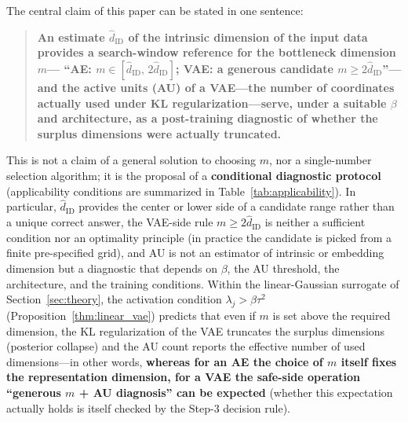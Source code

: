 \documentclass[make,article,submit,pdftex,moreauthors]{Definitions/mdpi}
\newcommand{\hatdID}{\hat{d}_{\mathrm{ID}}}
\begin{document}
The central claim of this paper can be stated in one sentence:
\begin{quote}
\textbf{An estimate $\hatdID$ of the intrinsic dimension of the input data
provides a search-window reference for the bottleneck dimension $m$---%
``AE: $m \in [\hatdID,\, 2\hatdID]$; VAE: a generous candidate
$m \geq 2\hatdID$''---and the active units (AU) of a VAE---the number of
coordinates actually used under KL regularization---serve, under a suitable
$\beta$ and architecture, as a post-training diagnostic of whether the
surplus dimensions were actually truncated.}
\end{quote}
This is not a claim of a general solution to choosing $m$, nor a
single-number selection algorithm; it is the proposal of a
\textbf{conditional diagnostic protocol}
(applicability conditions are summarized in
Table~\ref{tab:applicability}).
In particular, $\hatdID$ provides the center or lower side of a candidate
range rather than a unique correct answer, the VAE-side rule
$m \geq 2\hatdID$ is neither a sufficient condition nor an optimality
principle (in practice the candidate is picked from a finite pre-specified
grid), and AU is not an estimator of intrinsic or embedding dimension but a
diagnostic that depends on $\beta$, the AU threshold, the architecture, and
the training conditions.
Within the linear-Gaussian surrogate of Section~\ref{sec:theory}, the
activation condition $\lambda_j > \beta\tau^2$
(Proposition~\ref{thm:linear_vae}) predicts that even if $m$ is set above
the required dimension, the KL regularization of the VAE truncates the
surplus dimensions (posterior collapse) and the AU count reports the
effective number of used dimensions---in other words,
\textbf{whereas for an AE the choice of $m$ itself fixes the representation
dimension, for a VAE the safe-side operation ``generous $m$ + AU
diagnosis'' can be expected} (whether this expectation actually holds is
itself checked by the Step-3 decision rule).
\end{document}
